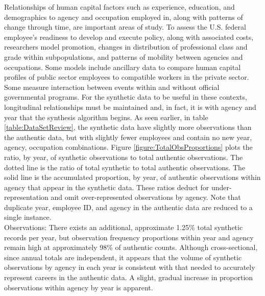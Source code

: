 \documentclass[10pt, letterpaper]{article}
\begin{document}
\begin{spacing}{1.0}
Relationships of human capital factors such as experience, education, and demographics to agency and occupation employed in, along with patterns of change through time, are important areas of study.  To assess the U.S. federal employee's readiness to develop and execute policy, along with associated costs, researchers model promotion, changes in distribution of professional class and grade within subpopulations, and patterns of mobility between agencies and occupations.  Some models include ancillary data to compare human capital profiles of public sector employees to compatible workers in the private sector.  Some measure interaction between events within and without official governmental programs.  For the synthetic data to be useful in these contexts, longitudinal relationships must be maintained and, in fact, it is with agency and year that the synthesis algorithm begins.  As seen earlier, in table \ref{table:DataSetReview}, the synthetic data have slightly more observations than the authentic data, but with slightly fewer employees and contain no new year, agency, occupation combinations.  Figure \ref{figure:TotalObsProportions} plots the ratio, by year, of synthetic observations to total authentic observations.  The dotted line is the ratio of total synthetic to total authentic observations.  The solid line is the accumulated proportion, by year, of authentic observations within agency that appear in the synthetic data.  These ratios deduct for under-representation and omit over-represented observations by agency.  Note that duplicate year, employee ID, and agency in the authentic data are reduced to a single instance.\\

Observations:  There exists an additional, approximate 1.25\% total synthetic records per year, but observation frequency proportions within year and agency remain high at approximately 98\% of authentic counts.  Although cross-sectional, since annual totals are independent, it appears that the volume of synthetic observations by agency in each year is consistent with that needed to accurately represent careers in the authentic data.  A slight, gradual increase in proportion observations within agency by year is apparent. 

\vspace{2pt}


\end{spacing}
\end{document}
